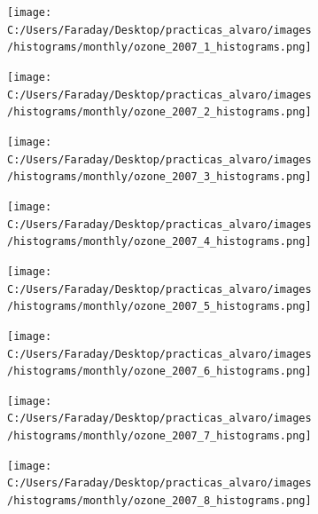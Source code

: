 \documentclass[12pt]{article}
\begin{document}
\begin{figure}[H]
\centering
\begin{subfigure}[h]{0.45\textwidth}
\texttt{[image: C:/Users/Faraday/Desktop/practicas\_alvaro/images/histograms/monthly/ozone\_2007\_1\_histograms.png]}
\caption{}
\label{fig:hist-mon-2-1-2007}
\end{subfigure}
%
\begin{subfigure}[H]{0.45\textwidth}
\texttt{[image: C:/Users/Faraday/Desktop/practicas\_alvaro/images/histograms/monthly/ozone\_2007\_2\_histograms.png]}
\caption{}
\label{fig:hist-mon-2-2-2007}
\end{subfigure}
\caption{}
\end{figure}

\begin{figure}[H]
\centering
\begin{subfigure}[h]{0.45\textwidth}
\texttt{[image: C:/Users/Faraday/Desktop/practicas\_alvaro/images/histograms/monthly/ozone\_2007\_3\_histograms.png]}
\caption{}
\label{fig:hist-mon-2-3-2007}
\end{subfigure}
%
\begin{subfigure}[H]{0.45\textwidth}
\texttt{[image: C:/Users/Faraday/Desktop/practicas\_alvaro/images/histograms/monthly/ozone\_2007\_4\_histograms.png]}
\caption{}
\label{fig:hist-mon-2-4-2007}
\end{subfigure}
\caption{}
\end{figure}

\begin{figure}[H]
\centering
\begin{subfigure}[h]{0.45\textwidth}
\texttt{[image: C:/Users/Faraday/Desktop/practicas\_alvaro/images/histograms/monthly/ozone\_2007\_5\_histograms.png]}
\caption{}
\label{fig:hist-mon-2-5-2007}
\end{subfigure}
%
\begin{subfigure}[H]{0.45\textwidth}
\texttt{[image: C:/Users/Faraday/Desktop/practicas\_alvaro/images/histograms/monthly/ozone\_2007\_6\_histograms.png]}
\caption{}
\label{fig:hist-mon-2-6-2007}
\end{subfigure}
\caption{}
\end{figure}

\newpage

\begin{figure}[H]
\centering
\begin{subfigure}[h]{0.45\textwidth}
\texttt{[image: C:/Users/Faraday/Desktop/practicas\_alvaro/images/histograms/monthly/ozone\_2007\_7\_histograms.png]}
\caption{}
\label{fig:hist-mon-2-7-2007}
\end{subfigure}
%
\begin{subfigure}[H]{0.45\textwidth}
\texttt{[image: C:/Users/Faraday/Desktop/practicas\_alvaro/images/histograms/monthly/ozone\_2007\_8\_histograms.png]}
\caption{}
\label{fig:hist-mon-2-8-2007}
\end{subfigure}
\caption{}
\end{figure}
\end{document}
